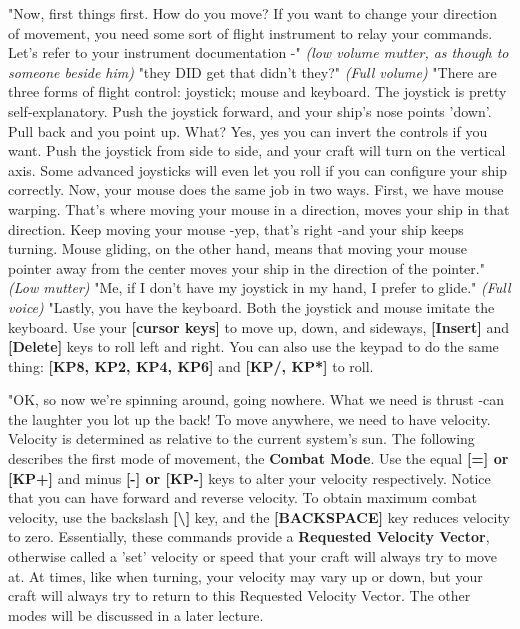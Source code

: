 \documentclass{article}
\begin{document}
"Now, first things first. How do you move? If you want to change your direction of movement, you need some sort of flight instrument to relay your commands. Let's refer to your instrument documentation -" \textit{(low volume mutter, as though to someone beside him) }"they DID get that didn't they?" \textit{(Full volume) }"There are three forms of flight control: joystick; mouse and keyboard. The joystick is pretty self-explanatory. Push the joystick forward, and your ship's nose points 'down'. Pull back and you point up. What? Yes, yes you can invert the controls if you want. Push the joystick from side to side, and your craft will turn on the vertical axis. Some advanced joysticks will even let you roll if you can configure your ship correctly. Now, your mouse does the same job in two ways. First, we have mouse warping. That's where moving your mouse in a direction, moves your ship in that direction. Keep moving your mouse -yep, that's right -and your ship keeps turning. Mouse gliding, on the other hand, means that moving your mouse pointer away from the center moves your ship in the direction of the pointer." \textit{(Low mutter) }"Me, if I don't have my joystick in my hand, I prefer to glide." \textit{(Full voice) }"Lastly, you have the keyboard. Both the joystick and mouse imitate the keyboard. Use your \textbf{[cursor keys] }to move up, down, and sideways, \textbf{[Insert] }and \textbf{[Delete] }keys to roll left and right. You can also use the keypad to do the same thing: \textbf{[KP8, KP2, KP4, KP6]} and \textbf{[KP/, KP*]} to roll. 

"OK, so now we're spinning around, going nowhere. What we need is thrust -can the laughter you lot up the back! To move anywhere, we need to have velocity. Velocity is determined as relative to the current system's sun. The following describes the first mode of movement, the \textbf{Combat Mode}. Use the equal \textbf{[=] or [KP+]} and minus \textbf{[-] or [KP-]} keys to alter your velocity respectively.  Notice that you can have forward and reverse velocity. To obtain maximum combat velocity, use the backslash \textbf{[\textbackslash ] }key, and the \textbf{[BACKSPACE] }key reduces velocity to zero. Essentially, these commands provide a \textbf{Requested Velocity Vector}, otherwise called a 'set' velocity or speed that your craft will always try to move at. At times, like when turning, your velocity may vary up or down, but your craft will always try to return to this Requested Velocity Vector. The other modes will be discussed in a later lecture. 
\end{document}
